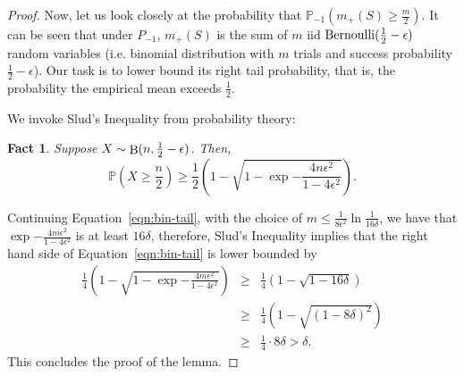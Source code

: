 \documentclass{article}
\newtheorem{fact}{Fact}
\DeclareMathOperator*{\Bin}{{\rm B}}
\newcommand{\PP}{\mathbb{P}}
\DeclareMathOperator*{\Ber}{{\rm Bernoulli}}
\begin{document}
\begin{proof}
Now, let us look closely at the probability that
$\PP_{-1}(m_+(S) \geq \frac m 2)$. It can be seen that under $P_{-1}$,
$m_+(S)$ is the sum of $m$ iid $\Ber(\frac12-\epsilon)$ random variables (i.e.  binomial distribution with $m$ trials and success probability $\frac12-\epsilon$).
Our task is to lower bound its right tail probability, that is, the probability the empirical mean exceeds $\frac12$.

We invoke Slud's Inequality from probability theory:
\begin{fact}
Suppose $X \sim \Bin(n,\frac12-\epsilon)$. Then,
\[ \PP(X \geq \frac n 2) \geq \frac12 (1 - \sqrt{1 - \exp{-\frac{4 n \epsilon^2}{1 - 4\epsilon^2}}}). \]
\end{fact}

Continuing Equation~\eqref{eqn:bin-tail}, with the choice of $m \leq \frac{1}{8\epsilon^2} \ln\frac1{16\delta}$, we have that $\exp{-\frac{4 m \epsilon^2}{1 - 4\epsilon^2}}$ is at least $16\delta$, therefore, Slud's Inequality implies that the right hand side of Equation~\eqref{eqn:bin-tail} is lower bounded by
\begin{eqnarray*}
  \frac14 (1 - \sqrt{1 - \exp{-\frac{4 m \epsilon^2}{1 - 4\epsilon^2}}})
  &\geq& \frac14 (1 - \sqrt{1 - 16\delta}) \\
  &\geq& \frac14 (1 - \sqrt{(1 - 8\delta)^2}) \\
  &\geq& \frac 1 4 \cdot 8\delta > \delta.
\end{eqnarray*}
This concludes the proof of the lemma.
\end{proof}



\end{document}
